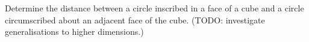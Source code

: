 Determine the distance between a circle inscribed in a face of a cube
and a circle circumscribed about an adjacent face of the cube.
\newline (TODO: investigate generalisations to higher dimensions.)
